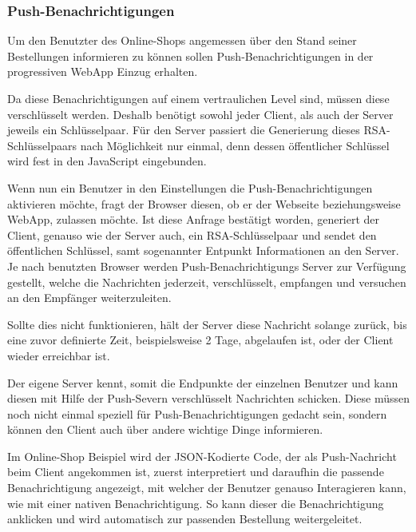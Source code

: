 \documentclass[a4paper,12pt,ngerman,listof=numbered]{scrartcl}      %
\begin{document}
	\subsubsection{Push-Benachrichtigungen}
	Um den Benutzter des Online-Shops angemessen über den Stand seiner Bestellungen informieren zu können sollen Push-Benachrichtigungen in der progres\-siven WebApp Einzug erhalten.\par
	Da diese Benachrichtigungen auf einem vertraulichen Level sind, müssen diese verschlüsselt werden. Deshalb benötigt sowohl jeder Client, als auch der Server jeweils ein Schlüsselpaar. Für den Server passiert die Generierung dieses RSA-Schlüsselpaars nach Möglichkeit nur einmal, denn dessen öffentlicher Schlüssel wird fest in den JavaScript eingebunden.\par
	Wenn nun ein Benutzer in den Einstellungen die Push-Be\-nach\-rich\-ti\-gungen aktivieren möchte, fragt der Browser diesen, ob er der Webseite beziehungsweise Web\-App, zulassen möchte. Ist diese Anfrage bestätigt worden, generiert der Client, genauso wie der Server auch, ein RSA-Schlüsselpaar und sendet den öffentlichen Schlüssel, samt sogenannter Entpunkt Informationen an den Server. Je nach benutzten Browser werden Push-Benachrichtigungs Server zur Verfügung gestellt, welche die Nachrichten jederzeit, verschlüsselt, empfangen und versuchen an den Empfänger weiterzuleiten.\par
	Sollte dies nicht funktionieren, hält der Server diese Nachricht solange zurück, bis eine zuvor definierte Zeit, beispielsweise 2 Tage, abgelaufen ist, oder der Client wieder erreichbar ist.\par
	Der eigene Server kennt, somit die Endpunkte der einzelnen Benutzer und kann diesen mit Hilfe der Push-Severn verschlüsselt Nachrichten schicken. Diese müs\-sen noch nicht einmal speziell für Push-Be\-nach\-rich\-ti\-gungen gedacht sein, sondern können den Client auch über andere wichtige Dinge informieren.\par
	Im Online-Shop Beispiel wird der JSON-Kodierte Code, der als Push-Nachricht beim Client angekommen ist, zuerst interpretiert und daraufhin die passende Benachrichtigung angezeigt, mit welcher der Benutzer genauso Interagieren kann, wie mit einer nativen Benachrichtigung. So kann dieser die Benachrichtigung an\-klicken und wird automatisch zur passenden Bestellung weitergeleitet.\par
	
\end{document}
